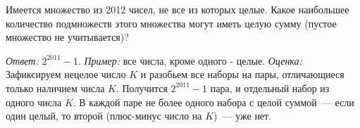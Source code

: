 Имеется множество из 2012 чисел, не все из которых целые.
Какое наибольшее количество подмножеств этого множества могут иметь целую
сумму (пустое множество не учитывается)?

\solution
\emph{Ответ:} $2^{2011} - 1$.
\emph{Пример:}
все числа, кроме одного - целые.
\emph{Оценка:}
Зафиксируем нецелое число $K$ и разобьем все наборы на пары, отличающиеся
только наличием числа $K$.
Получится $2^{2011} - 1$ пара, и отдельный набор из одного числа $K$.
В каждой паре не более одного набора с целой суммой~--- если один целый,
то второй (плюс-минус число на $K$)~--- уже нет.

